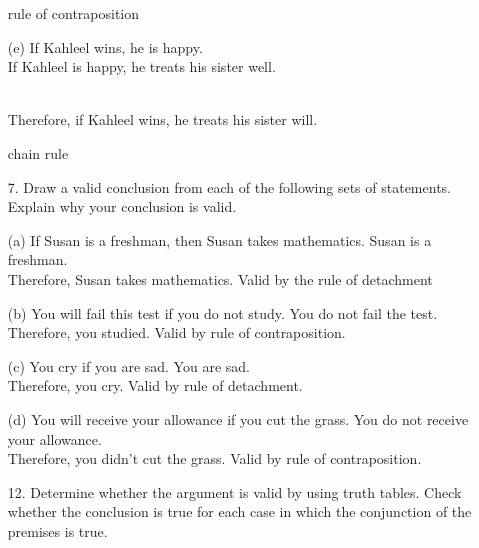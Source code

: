 \documentclass{article}
\begin{document}
\begin{itemize}
    {\hspace*{0.4cm} \color{blue} rule of contraposition}
    
    (e) If Kahleel wins, he is happy.\\
    \hspace*{0.4cm} If Kahleel is happy, he treats his sister well.\\
    \\
    \hspace*{0.4cm} Therefore, if Kahleel wins, he treats his sister will.
    
    {\hspace*{0.4cm} \color{blue} chain rule}
    
    \item[7.] Draw a valid conclusion from each of the following sets of statements.   Explain why your conclusion is valid.
    
    (a) If Susan is a freshman, then Susan takes mathematics.  Susan is a freshman.\\
    {\hspace*{0.4cm} \color{blue} Therefore, Susan takes mathematics. Valid by the rule of detachment}
    
    (b) You will fail this test if you do not study.  You do not fail the test.\\
    {\hspace*{0.4cm} \color{blue} Therefore, you studied. Valid by rule of contraposition.}
    
    (c) You cry if you are sad.  You are sad.\\
    {\hspace*{0.4cm} \color{blue} Therefore, you cry. Valid by rule of detachment.}
    
    (d) You will receive your allowance if you cut the grass.  You do not receive your allowance.\\
    {\hspace*{0.4cm} \color{blue} Therefore, you didn't cut the grass. Valid by rule of contraposition.}
    
    \item[12.] Determine whether the argument is valid by using truth tables.  Check whether the conclusion is true for each case in which the conjunction of the premises is true.  
    

\end{itemize}
\end{document}

